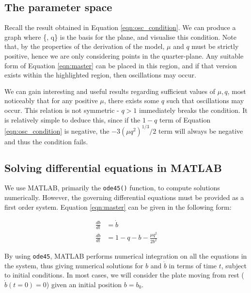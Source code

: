 \documentclass{article}
\begin{document}

\subsection{The parameter space}


Recall the result obtained in Equation \ref{eqn:osc_condition}.
We can produce a graph where \{\mu, q\} is the basis for the plane,
and visualise this condition.
Note that, by the properties of the derivation of the model,
$\mu$ and $q$ must be strictly positive,
hence we are only considering points in the quarter-plane.
Any suitable form of Equation \ref{eqn:master} can be placed in this region,
and if that version exists within the highlighted region,
then oscillations may occur.

We can gain interesting and useful results regarding sufficient values of $\mu, q$,
most noticeably that for any positive $\mu$, there exists some $q$ such that oscillations may occur.
This relation is not symmetric - $q>1$ immediately breaks the condition.
It is relatively simple to deduce this, since if the $1-q$ term of Equation \ref{eqn:osc_condition} is negative,
the $-3(\mu q^2)^{1/3}/2$ term will always be negative and thus the condition fails.

\subsection{Solving differential equations in MATLAB}

We use MATLAB, primarily the \texttt{ode45()} function, to compute solutions numerically.
However, the governing differential equations must be provided as a first order system.
Equation \ref{eqn:master} can be given in the following form:

\begin{align}
    \frac{db}{dt} &= \dot{b} \\
    \frac{d\dot{b}}{dt} &= 1 - q - b - \frac{\mu q^2}{2b^2}
    \label{eqn:first_order_system}
\end{align}

By using \texttt{ode45}, MATLAB performs numerical integration on all the equations in the system,
thus giving numerical solutions for $b$ and $\dot{b}$ in terms of time $t$, subject to initial conditions.
In most cases, we will consider the plate moving from rest ($\dot{b}(t=0) = 0$) given an initial position $b=b_0$.
\end{document}
